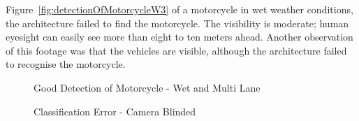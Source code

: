 \documentclass[12pt]{report} %
\begin{document}
	Figure~\ref{fig:detectionOfMotorcycleW3} of a motorcycle in wet weather conditions, the architecture failed to find the motorcycle. The visibility is moderate; human eyesight can easily see more than eight to ten meters ahead. Another observation of this footage was that the vehicles are visible, although the architecture failed to recognise the motorcycle.
	\begin{figure}[h]
		\begin{floatrow}
			{
				\caption{Good Detection of Motorcycle - Wet and Multi Lane}
				\label{fig:detectionOfMotorcycleW1}
			}
		
			{
				\caption{Classification Error - Camera Blinded}
				\label{fig:detectionOfMotorcycleW2}
			}
		

\end{floatrow}
\end{figure}
\end{document}
